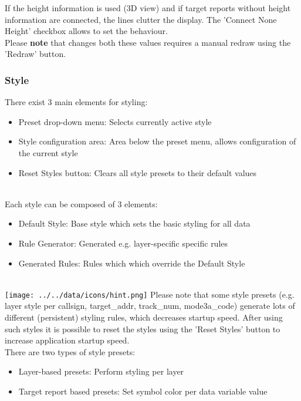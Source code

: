 If the height information is used (3D view) and if target reports without height information are connected, the lines clutter the display. The 'Connect None Height' checkbox allows to set the behaviour. \\

Please \textbf{note} that changes both these values requires a manual redraw using the 'Redraw' button.

\subsubsection{Style}
\label{sec:style}

There exist 3 main elements for styling:
\begin{itemize}
 \item Preset drop-down menu: Selects currently active style
 \item Style configuration area: Area below the preset menu, allows configuration of the current style
 \item Reset Styles button: Clears all style presets to their default values
\end{itemize}
\  \\

Each style can be composed of 3 elements:
\begin{itemize}
 \item Default Style: Base style which sets the basic styling for all data
 \item Rule Generator: Generated e.g. layer-specific specific rules
 \item Generated Rules: Rules which which override the Default Style
\end{itemize}
\  \\

\texttt{[image: ../../data/icons/hint.png]} Please note that some style presets (e.g. layer style per callsign, target\_addr, track\_num, mode3a\_code) generate lots of different (persistent) styling rules, which decreases startup speed. After using such styles it is possible to reset the styles using the 'Reset Styles' button to increase application startup speed. \\

There are two types of style presets:
\begin{itemize}
 \item Layer-based presets: Perform styling per layer
 \item Target report based presets: Set symbol color per data variable value
\end{itemize}
\  \\

